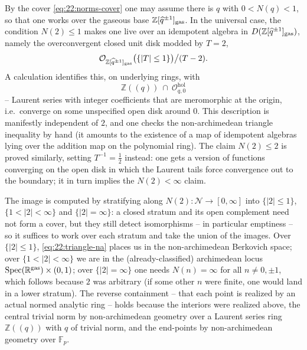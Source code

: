 \begin{remark}
\label{rmk:22:triangle-proof}
By the cover \eqref{eq:22:norms-cover} one may assume there is $q$ with
$0<N(q)<1$, so that one works over the gaseous base $\mathbb Z[\widehat q^{\pm1}]
_{\mathrm{gas}}$. In the universal case, the condition $N(2)\le1$ makes one live over an
idempotent algebra in $D(\mathbb Z[\widehat q^{\pm1}]_{\mathrm{gas}})$, namely the
overconvergent closed unit disk modded by $T=2$,
\begin{equation*}
\mathcal O_{\mathbb Z[\widehat q^{\pm1}]_{\mathrm{gas}}}\bigl(\{|T|\le1\}\bigr)\big/(T-2).
\end{equation*}
A calculation identifies this, on underlying rings, with
\begin{equation*}
\mathbb Z(\!(q)\!)\ \cap\ \mathcal O^{\mathrm{hol}}_{q,0}
\end{equation*}
-- Laurent series with integer coefficients that are meromorphic at the origin,
i.e.\ converge on some unspecified open disk around $0$. This description is
manifestly independent of $2$, and one checks the non-archimedean triangle
inequality by hand (it amounts to the existence of a map of idempotent algebras
lying over the addition map on the polynomial ring). The claim $N(2)\le2$ is
proved similarly, setting $T^{-1}=\tfrac12$ instead: one gets a version of
functions converging on the open disk in which the Laurent tails force
convergence out to the boundary; it in turn implies the $N(2)<\infty$ claim.
\end{remark}

\begin{remark}
\label{rmk:22:image-proof}
The image is computed by stratifying along $N(2)\colon\mathcal N\to[0,\infty]$
into $\{|2|\le1\}$, $\{1<|2|<\infty\}$ and $\{|2|=\infty\}$: a closed stratum
and its open complement need not form a cover, but they still detect
isomorphisms -- in particular emptiness -- so it suffices to work over each
stratum and take the union of the images. Over $\{|2|\le1\}$,
\eqref{eq:22:triangle-na} places us in the non-archimedean Berkovich space; over
$\{1<|2|<\infty\}$ we are in the (already-classified) archimedean locus
$\operatorname{Spec}(\mathbb R^{\mathrm{gas}})\times(0,1)$; over $\{|2|=\infty\}$ one needs $N(n)=\infty$
for all $n\neq0,\pm1$, which follows because $2$ was arbitrary (if some other
$n$ were finite, one would land in a lower stratum). The reverse containment --
that each point is realized by an actual normed analytic ring -- holds because
the interiors were realized above, the central trivial norm by non-archimedean
geometry over a Laurent series ring $\mathbb Z(\!(q)\!)$ with $q$ of trivial
norm, and the end-points by non-archimedean geometry over $\mathbb F_p$.
\end{remark}


